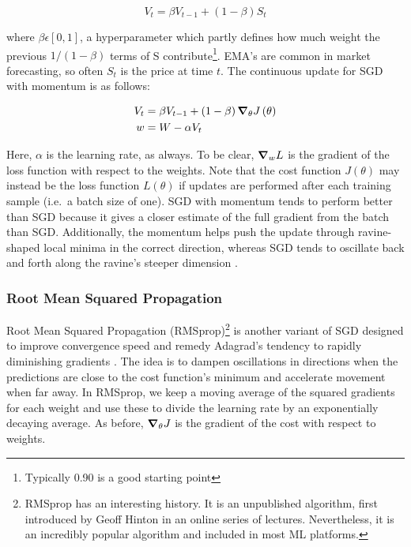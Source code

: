\begin{equation}
    \label{eq:SGD-w-momentum}
    V_t = \beta V_{t-1} + (1 - \beta)S_t
\end{equation}

\noindent where $ \beta \epsilon [0,1]$, a hyperparameter which partly defines how much weight the previous $ 1/(1-\beta) $ terms of S contribute\footnote{Typically 0.90 is a good starting point}. EMA's are common in market forecasting, so often $ S_t $  is the price at time $ t $. The continuous update for SGD with momentum is as follows:

\begin{align}
    V_t &= \beta V_{t-1}  + \left( 1 - \beta \right) \grad_\theta J \left( \theta \right)\\
    w &= W - \alpha V_t
\end{align}


Here, $ \alpha $  is the learning rate, as always. To be clear, $\grad_w L$ is the gradient of the loss function with respect to the weights. Note that the cost function $ J(\theta) $ may instead be the loss function $ L(\theta) $ if updates are performed after each training sample (i.e.~a batch size of one). SGD with momentum tends to perform better than SGD because it gives a closer estimate of the full gradient from the batch than SGD. Additionally, the momentum helps push the update through ravine-shaped local minima in the correct direction, whereas SGD tends to oscillate back and forth along the ravine's steeper dimension \cite{qian1999momentum}.

\subsubsection{Root Mean Squared Propagation}
Root Mean Squared Propagation (RMSprop)\footnote{RMSprop has an interesting history. It is an unpublished algorithm, first introduced by Geoff Hinton in an online series of lectures. Nevertheless, it is an incredibly popular algorithm and included in most ML platforms.} is another variant of SGD designed to improve convergence speed and remedy Adagrad's \cite{adagrad} tendency to rapidly diminishing gradients \cite{improving-rprop}\cite{2017marginal-adagrad}. The idea is to dampen oscillations in directions when the predictions are close to the cost function's minimum and accelerate movement when far away. In RMSprop, we keep a moving average of the squared gradients for each weight and use these to divide the learning rate by an exponentially decaying average. As before, $\grad_\theta J$ is the gradient of the cost with respect to weights.

